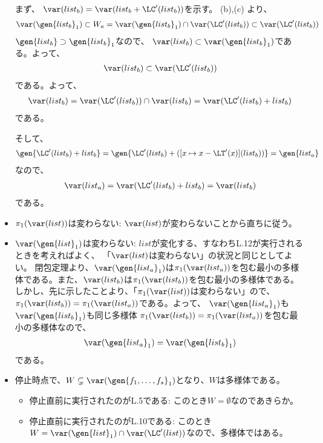 \begin{myproof}
\begin{itemize}
    まず、
    $\var(list_b) = \var(list_b + \LC'(list_b))$を示す。
    (b),(c)
    より、
    \begin{align}
      \var(\gen{list_b}_1) \subset W_a =
      \var(\gen{list_b}_1) \cap \var(\LC'(list_b))
      \subset
      \var(\LC'(list_b))
    \end{align}
    $\gen{list_b} \supset \gen{list_b}_1$なので、
    $\var(list_b) \subset \var(\gen{list_b}_1)$である。よって、
    \begin{align}
      \var(list_b) \subset \var(\LC'(list_b))
    \end{align}
    である。よって、
    \begin{align}
      \var(list_b) = \var(\LC'(list_b))\cap \var(list_b) =
      \var(\LC'(list_b) + list_b)
    \end{align}
    である。

    そして、
    \begin{align}
      \gen{\LC'(list_b) + list_b} =
      \gen{\LC'(list_b) + ([x\mapsto x-\LT'(x)](list_b)) }
      = \gen{list_a}
    \end{align}
    なので、
    \begin{align}
      \var(list_a) = \var(\LC'(list_b) + list_b)
      =
      \var(list_b)
    \end{align}
    である。

    \item $\pi_1(\var(list))$は変わらない:
    $\var(list)$が変わらないことから直ちに従う。
    \item $\var(\gen{list}_1)$は変わらない:
    $list$が変化する、すなわちL.12が実行されるときを考えればよく、
    「$\var(list)$は変わらない」の状況と同じとしてよい。
    閉包定理より、$\var(\gen{list_a}_1)$は$\pi_1(\var(list_a))$を包む最小の多様体である。また、$\var(list_b)$は$\pi_1(\var(list_b))$を包む最小の多様体である。しかし、先に示したことより、「$\pi_1(\var(list))$は変わらない」ので、
    $\pi_1(\var(list_b))=\pi_1(\var(list_a))$である。よって、
    $\var(\gen{list_a}_1)$も$\var(\gen{list_b}_1)$も同じ多様体
    $\pi_1(\var(list_b))=\pi_1(\var(list_a))$を包む最小の多様体なので、
    \begin{align}
      \var(\gen{list_a}_1) = \var(\gen{list_b}_1)
    \end{align}
    である。
    \item 停止時点で、$W\subsetneq \var(\gen{f_1,\dots,f_s}_1)$となり、$W$は多様体である。
    \begin{itemize}
      \item 停止直前に実行されたのがL.5である:
      このとき$W=\emptyset$なのであきらか。
      \item 停止直前に実行されたのがL.10である:
      このとき$W=\var(\gen{list}_1) \cap \var(\LC'(list))$なので、多様体ではある。


\end{itemize}
\end{itemize}
\end{myproof}
